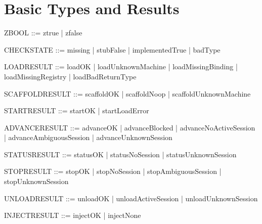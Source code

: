 \documentclass[a4paper,10pt,fleqn]{article}
\begin{document}
\section{Basic Types and Results}

\begin{zed}
\end{zed}

\begin{zed}
  ZBOOL ::= ztrue | zfalse
\end{zed}

\begin{zed}
  CHECKSTATE ::= missing | stubFalse | implementedTrue | badType
\end{zed}

\begin{zed}
  LOADRESULT ::= loadOK | loadUnknownMachine | loadMissingBinding |
    loadMissingRegistry | loadBadReturnType
\end{zed}

\begin{zed}
  SCAFFOLDRESULT ::= scaffoldOK | scaffoldNoop | scaffoldUnknownMachine
\end{zed}

\begin{zed}
  STARTRESULT ::= startOK | startLoadError
\end{zed}

\begin{zed}
  ADVANCERESULT ::= advanceOK | advanceBlocked | advanceNoActiveSession |
    advanceAmbiguousSession | advanceUnknownSession
\end{zed}

\begin{zed}
  STATUSRESULT ::= statusOK | statusNoSession | statusUnknownSession
\end{zed}

\begin{zed}
  STOPRESULT ::= stopOK | stopNoSession | stopAmbiguousSession | stopUnknownSession
\end{zed}

\begin{zed}
  UNLOADRESULT ::= unloadOK | unloadActiveSession | unloadUnknownSession
\end{zed}

\begin{zed}
  INJECTRESULT ::= injectOK | injectNone
\end{zed}
\end{document}
